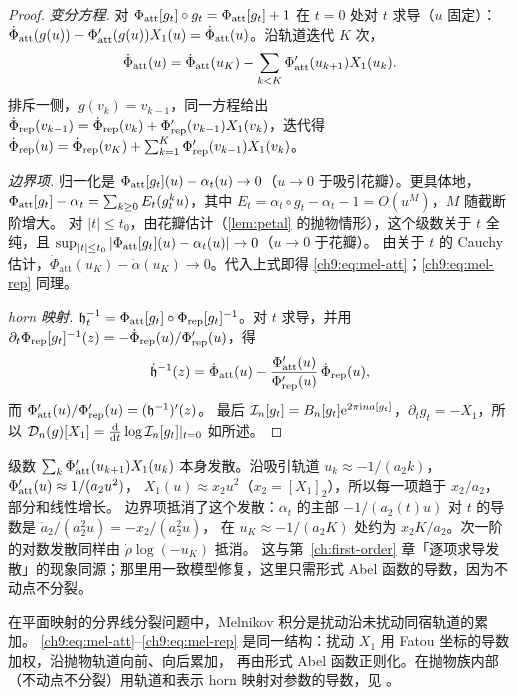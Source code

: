 \begin{proof}
\emph{变分方程.} 对 $\Phi_{\mathrm{att}}[g_t]\circ g_t=\Phi_{\mathrm{att}}[g_t]+1$ 在 $t=0$ 处对 $t$ 求导（$u$ 固定）：
$\dot\Phi_{\mathrm{att}}(g(u))-\Phi_{\mathrm{att}}'(g(u))X_1(u)=\dot\Phi_{\mathrm{att}}(u)$。沿轨道迭代 $K$ 次，
\[
 \dot\Phi_{\mathrm{att}}(u)=\dot\Phi_{\mathrm{att}}(u_K)-\sum_{k<K}\Phi_{\mathrm{att}}'(u_{k+1})X_1(u_k).
\]
排斥一侧，$g(v_k)=v_{k-1}$，同一方程给出 $\dot\Phi_{\mathrm{rep}}(v_{k-1})=\dot\Phi_{\mathrm{rep}}(v_k)+\Phi_{\mathrm{rep}}'(v_{k-1})X_1(v_k)$，迭代得
$\dot\Phi_{\mathrm{rep}}(u)=\dot\Phi_{\mathrm{rep}}(v_K)+\sum_{k=1}^K\Phi_{\mathrm{rep}}'(v_{k-1})X_1(v_k)$。

\emph{边界项.} 归一化是 $\Phi_{\mathrm{att}}[g_t](u)-\alpha_t(u)\to0$（$u\to0$ 于吸引花瓣）。更具体地，
$\Phi_{\mathrm{att}}[g_t]-\alpha_t=\sum_{k\ge0}E_t(g_t^ku)$，其中 $E_t=\alpha_t\circ g_t-\alpha_t-1=O(u^{M})$，$M$ 随截断阶增大。
对 $|t|\le t_0$，由花瓣估计（\cref{lem:petal} 的抛物情形），这个级数关于 $t$ 全纯，且 $\sup_{|t|\le t_0}|\Phi_{\mathrm{att}}[g_t](u)-\alpha_t(u)|\to0$（$u\to0$ 于花瓣）。
由关于 $t$ 的 Cauchy 估计，$\dot\Phi_{\mathrm{att}}(u_K)-\dot\alpha(u_K)\to0$。代入上式即得 \eqref{ch9:eq:mel-att}；\eqref{ch9:eq:mel-rep} 同理。

\emph{horn 映射.} $\mathfrak h_t^{-1}=\Phi_{\mathrm{att}}[g_t]\circ\Phi_{\mathrm{rep}}[g_t]^{-1}$。对 $t$ 求导，并用 $\partial_t\Phi_{\mathrm{rep}}[g_t]^{-1}(z)=-\dot\Phi_{\mathrm{rep}}(u)/\Phi_{\mathrm{rep}}'(u)$，得
\[
 \dot{\mathfrak h}{}^{-1}(z)=\dot\Phi_{\mathrm{att}}(u)-\frac{\Phi_{\mathrm{att}}'(u)}{\Phi_{\mathrm{rep}}'(u)}\,\dot\Phi_{\mathrm{rep}}(u),
\]
而 $\Phi_{\mathrm{att}}'(u)/\Phi_{\mathrm{rep}}'(u)=(\mathfrak h^{-1})'(z)$。
最后 $\mathcal I_n[g_t]=B_n[g_t]\mathrm{e}^{2\pi\mathrm{i} na[g_t]}$，$\partial_tg_t=-X_1$，所以 $\mathcal D_n(g)[X_1]=\frac{\mathrm{d}}{\mathrm{d} t}\log\mathcal I_n[g_t]|_{t=0}$ 如所述。
\end{proof}

\begin{remark}[发散的抵消]\label{ch9:rem:cancellation}
级数 $\sum_k\Phi_{\mathrm{att}}'(u_{k+1})X_1(u_k)$ 本身发散。沿吸引轨道 $u_k\approx-1/(a_2k)$，$\Phi_{\mathrm{att}}'(u)\approx1/(a_2u^2)$，
$X_1(u)\approx x_2u^2$（$x_2=[X_1]_2$），所以每一项趋于 $x_2/a_2$，部分和线性增长。
边界项抵消了这个发散：$\alpha_t$ 的主部 $-1/(a_2(t)u)$ 对 $t$ 的导数是 $\dot a_2/(a_2^2u)=-x_2/(a_2^2u)$，
在 $u_K\approx-1/(a_2K)$ 处约为 $x_2K/a_2$。次一阶的对数发散同样由 $\dot\rho\log(-u_K)$ 抵消。
这与第~\ref{ch:first-order} 章「逐项求导发散」的现象同源；那里用一致模型修复，这里只需形式 Abel 函数的导数，因为不动点不分裂。
\end{remark}

\begin{remark}
在平面映射的分界线分裂问题中，Melnikov 积分是扰动沿未扰动同宿轨道的累加。
\eqref{ch9:eq:mel-att}--\eqref{ch9:eq:mel-rep} 是同一结构：扰动 $X_1$ 用 Fatou 坐标的导数加权，沿抛物轨道向前、向后累加，
再由形式 Abel 函数正则化。在抛物族内部（不动点不分裂）用轨道和表示 horn 映射对参数的导数，见 \cite[Prop.~9.1]{BuffEcalleEpstein2013}。
\end{remark}

